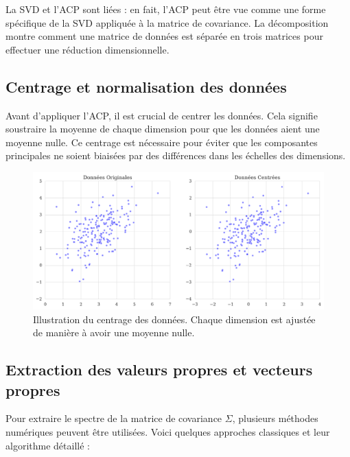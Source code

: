 \documentclass[a4paper,12pt]{report}
\begin{document}
La SVD et l’ACP sont liées : en fait, l’ACP peut être vue comme une forme spécifique de la SVD appliquée à la matrice de covariance.
La décomposition montre comment une matrice de données est séparée en trois matrices pour effectuer une réduction dimensionnelle.

\subsection{Centrage et normalisation des données}

Avant d'appliquer l'ACP, il est crucial de centrer les données. Cela signifie soustraire la moyenne de chaque dimension pour que les données aient une moyenne nulle. Ce centrage est nécessaire pour éviter que les composantes principales ne soient biaisées par des différences dans les échelles des dimensions.

\begin{figure}[H]
    \centering
    \includegraphics[width=1.1\textwidth]{centrage_normalisation.png}
    \caption{Illustration du centrage des données. Chaque dimension est ajustée de manière à avoir une moyenne nulle.}
    \label{fig:centrage}
\end{figure}

\subsection{Extraction des valeurs propres et vecteurs propres}
Pour extraire le spectre de la matrice de covariance \(\Sigma\), plusieurs méthodes numériques peuvent être utilisées. Voici quelques approches classiques et leur algorithme détaillé :
\end{document}
